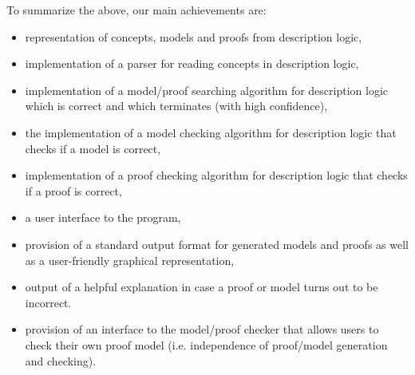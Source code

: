 To summarize the above, our main achievements are:
\begin{itemize}
\item representation of concepts, models and proofs from description logic,
\item implementation of a parser for reading concepts in description logic,
\item implementation of a model/proof searching algorithm for description logic which is correct and which terminates (with high confidence),
\item the implementation of a model checking algorithm for description logic that checks if a model is correct,
\item implementation of a proof checking algorithm for description logic that checks if a proof is correct,
\item a user interface to the program,
\item provision of a standard output format for generated models and proofs as well as a user-friendly graphical representation,
\item output of a helpful explanation in case a proof or model turns out to be incorrect.
\item provision of an interface to the model/proof checker that allows users to check their own proof model (i.e. independence of proof/model generation and checking).
\end{itemize}
